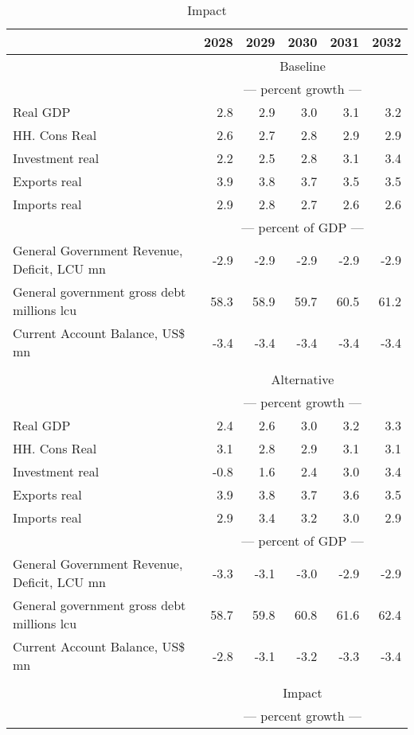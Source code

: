 \documentclass{article}
\begin{document}
 \begin{table}[ht]
\caption{Impact}
\begin{tabular}{lrrrrr}
\toprule
 & 2028 & 2029 & 2030 & 2031 & 2032 \\
\midrule
&\multicolumn{5}{c}{Baseline}           \\
&\multicolumn{5}{c}{--- percent growth ---}           \\
Real GDP & 2.8 & 2.9 & 3.0 & 3.1 & 3.2 \\
HH. Cons Real & 2.6 & 2.7 & 2.8 & 2.9 & 2.9 \\
Investment real & 2.2 & 2.5 & 2.8 & 3.1 & 3.4 \\
Exports real & 3.9 & 3.8 & 3.7 & 3.5 & 3.5 \\
Imports real & 2.9 & 2.8 & 2.7 & 2.6 & 2.6 \\
&\multicolumn{5}{c}{--- percent of GDP ---}           \\
General Government Revenue, Deficit, LCU mn & -2.9 & -2.9 & -2.9 & -2.9 & -2.9 \\
General government gross debt millions lcu & 58.3 & 58.9 & 59.7 & 60.5 & 61.2 \\
Current Account Balance, US\$ mn & -3.4 & -3.4 & -3.4 & -3.4 & -3.4 \\
&\multicolumn{5}{c}{ }           \\
&\multicolumn{5}{c}{Alternative}           \\
&\multicolumn{5}{c}{--- percent growth ---}           \\
Real GDP & 2.4 & 2.6 & 3.0 & 3.2 & 3.3 \\
HH. Cons Real & 3.1 & 2.8 & 2.9 & 3.1 & 3.1 \\
Investment real & -0.8 & 1.6 & 2.4 & 3.0 & 3.4 \\
Exports real & 3.9 & 3.8 & 3.7 & 3.6 & 3.5 \\
Imports real & 2.9 & 3.4 & 3.2 & 3.0 & 2.9 \\
&\multicolumn{5}{c}{--- percent of GDP ---}           \\
General Government Revenue, Deficit, LCU mn & -3.3 & -3.1 & -3.0 & -2.9 & -2.9 \\
General government gross debt millions lcu & 58.7 & 59.8 & 60.8 & 61.6 & 62.4 \\
Current Account Balance, US\$ mn & -2.8 & -3.1 & -3.2 & -3.3 & -3.4 \\
&\multicolumn{5}{c}{ }           \\
&\multicolumn{5}{c}{Impact}           \\
&\multicolumn{5}{c}{--- percent growth ---}           \\

\end{tabular}
\end{table}
\end{document}

